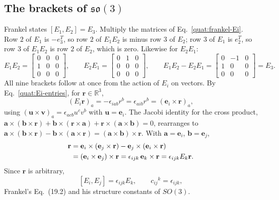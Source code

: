 \subsection{The brackets of \texorpdfstring{$\mathfrak{so}(3)$}{so(3)}}
Frankel states $[E_1,E_2]=E_3$. Multiply the matrices of
Eq.~\eqref{quat:frankel-Ei}. Row $2$ of $E_1$ is $-e_3^T$, so row $2$ of
$E_1E_2$ is minus row $3$ of $E_2$; row $3$ of $E_1$ is $e_2^T$, so row $3$
of $E_1E_2$ is row $2$ of $E_2$, which is zero. Likewise for $E_2E_1$:
\begin{equation}
 E_1E_2=\begin{bmatrix}0&0&0\\1&0&0\\0&0&0\end{bmatrix},\qquad
 E_2E_1=\begin{bmatrix}0&1&0\\0&0&0\\0&0&0\end{bmatrix},\qquad
 E_1E_2-E_2E_1=\begin{bmatrix}0&-1&0\\1&0&0\\0&0&0\end{bmatrix}=E_3 .
\end{equation}
All nine brackets follow at once from the action of $E_i$ on vectors. By
Eq.~\eqref{quat:Ei-entries}, for $\mathbf r\in\mathbb R^3$,
\begin{equation}\label{quat:Ei-cross}
 (E_i\mathbf r)_a=-\epsilon_{iab}r^b=\epsilon_{aib}r^b
 =(\mathbf e_i\times\mathbf r)_a ,
\end{equation}
using $(\mathbf u\times\mathbf v)_a=\epsilon_{acb}u^cv^b$ with
$\mathbf u=\mathbf e_i$. The Jacobi identity for the cross product,
$\mathbf a\times(\mathbf b\times\mathbf r)+\mathbf b\times(\mathbf r\times\mathbf a)
+\mathbf r\times(\mathbf a\times\mathbf b)=0$, rearranges to
$\mathbf a\times(\mathbf b\times\mathbf r)-\mathbf b\times(\mathbf a\times\mathbf r)
=(\mathbf a\times\mathbf b)\times\mathbf r$. With
$\mathbf a=\mathbf e_i$, $\mathbf b=\mathbf e_j$,
\begin{align}
 [E_i,E_j]\mathbf r
 &=\mathbf e_i\times(\mathbf e_j\times\mathbf r)
  -\mathbf e_j\times(\mathbf e_i\times\mathbf r)\notag\\
 &=(\mathbf e_i\times\mathbf e_j)\times\mathbf r
  =\epsilon_{ijk}\,\mathbf e_k\times\mathbf r
  =\epsilon_{ijk}E_k\mathbf r .\notag
\end{align}
Since $\mathbf r$ is arbitrary,
\begin{equation}\label{quat:so3-brackets}
 [E_i,E_j]=\epsilon_{ijk}E_k ,\qquad c_{ij}{}^k=\epsilon_{ijk},
\end{equation}
Frankel's Eq.~(19.2) and his structure constants of $SO(3)$.

